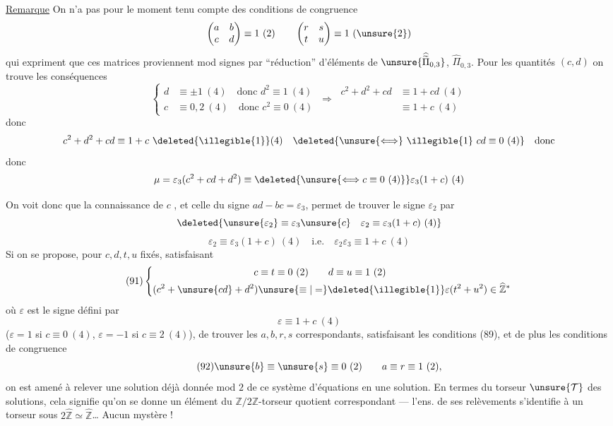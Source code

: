 \uline{Remarque} On n'a pas pour le moment tenu compte des conditions de
congruence
\[
\begin{pmatrix}a&b\\c&d\end{pmatrix}\equiv1\ (2)
\qquad
\begin{pmatrix}r&s\\t&u\end{pmatrix}\equiv1\ (\unsure{2})
\]
qui expriment que ces matrices proviennent mod signes par ``réduction''
d'éléments de
$\unsure{\widehat{\widetilde{\Pi}}_{0,3}}$, $\widehat{\Pi}_{0,3}$.
Pour les quantités $(c,d)$  on trouve les
conséquences
\[
\left\{\begin{aligned}
d&\equiv\pm1\ (4)\quad\text{donc }d^2\equiv1\ (4)\\
c&\equiv0,2\ (4)\quad\text{donc }c^2\equiv0\ (4)
\end{aligned}\right.
\ \Longrightarrow\
\begin{aligned}
c^2+d^2+cd&\equiv1+cd\ (4)\\
&\equiv1+c\ (4)
\end{aligned}
\]
donc
\[
c^2+d^2+cd\equiv1+c\ \deleted{\illegible{1}}(4)
\quad\deleted{\unsure{\Longleftrightarrow}\ \illegible{1}\ cd\equiv0\ (4)}
\quad\text{donc}
\]
donc
\[
\mu=\varepsilon_3(c^2+cd+d^2)\equiv
\deleted{\unsure{\Longleftrightarrow c\equiv0\ (4)}}
\varepsilon_3(1+c)\ (4)
\]



On voit donc que la connaissance de $c$ 
, et celle du signe $ad-bc=\varepsilon_3$,
permet de trouver le signe $\varepsilon_2$  par
\[
\deleted{\unsure{\varepsilon_2}\equiv\varepsilon_3\unsure{c}\quad
\varepsilon_2\equiv\varepsilon_3(1+c)\ (4)}
\]
\[
\tag{90}
\varepsilon_2\equiv\varepsilon_3(1+c)\ (4)
\quad\text{i.e.}\quad
\varepsilon_2\varepsilon_3\equiv1+c\ (4)
\]
Si on se propose, pour $c,d,t,u$ fixés, satisfaisant
\[
\tag{91}
\left\{\begin{aligned}
c&\equiv t\equiv0\ (2)\qquad d\equiv u\equiv1\ (2)\\
(c^2+\unsure{cd}+d^2)&\unsure{\equiv|=}\deleted{\illegible{1}}
\varepsilon(t^2+u^2)\in\widehat{\mathbb Z}^{*}
\end{aligned}\right.
\]
où $\varepsilon$ 
est le signe défini par
\[
\varepsilon\equiv1+c\ (4)
\]
($\varepsilon=1$ si $c\equiv0\ (4)$, $\varepsilon=-1$ si
$c\equiv2\ (4)$), de trouver les $a,b,r,s$ correspondants,
satisfaisant les conditions (89), et de plus les conditions de congruence
\[
\tag{92}
\unsure{b}\equiv\unsure{s}\equiv0\ (2)\qquad
a\equiv r\equiv1\ (2),
\]
on est amené à relever une solution déjà donnée mod $2$ de ce système
d'équations en une solution. En termes du 
torseur $\unsure{\mathcal T}$ des solutions, cela signifie qu'on se donne
un élément du $\mathbb Z/2\mathbb Z$-torseur quotient correspondant
--- l'ens. de ses relèvements s'identifie à un torseur sous
$2\widehat{\mathbb Z}\simeq\widehat{\mathbb Z}$\ldots{} Aucun mystère !

